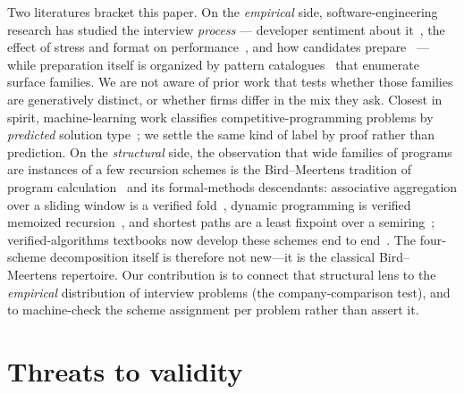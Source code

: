 \documentclass[11pt]{article}
\begin{document}
Two literatures bracket this paper. On the \emph{empirical} side, software-engineering
research has studied the interview \emph{process} --- developer sentiment about
it~\cite{behroozi19}, the effect of stress and format on performance~\cite{behroozi20}, and how
candidates prepare~\cite{bell25} --- while preparation itself is organized by pattern
catalogues~\cite{prashad} that enumerate surface families. We are not aware of prior work that
tests whether those families are generatively distinct, or whether firms differ in the mix they
ask. Closest in spirit, machine-learning work classifies competitive-programming problems by
\emph{predicted} solution type~\cite{algolabel}; we settle the same kind of label by proof
rather than prediction. On the
\emph{structural} side, the observation that wide families of programs are instances of a few recursion
schemes is the Bird--Meertens tradition of program calculation~\cite{bird-demoor} and its formal-methods
descendants: associative aggregation over a sliding window is a verified fold~\cite{afp_sliding}, dynamic
programming is verified memoized recursion~\cite{afp_dp}, and shortest paths are a least fixpoint over a
semiring~\cite{afp_dijkstra,afp_kleene,lehmann77}; verified-algorithms textbooks now develop these schemes end
to end~\cite{fav_book,nipkow_survey}. The four-scheme decomposition itself is therefore not new---it is the
classical Bird--Meertens repertoire. Our contribution is to connect that structural lens to the
\emph{empirical} distribution of interview problems (the company-comparison test), and to machine-check the
scheme assignment per problem rather than assert it.

\section{Threats to validity}
\label{sec:threats}
\end{document}
